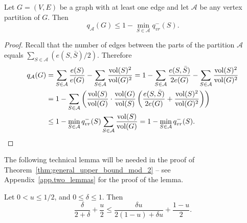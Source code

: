 \documentclass[runningheads, envcountsame, smallextended]{llncs}
\newcommand{\vol}{{\rm vol}}
\numberwithin{theorem}{section}
\numberwithin{definition}{section}
\numberwithin{lemma}{section}
\numberwithin{corollary}{section}
\numberwithin{proposition}{section}
\numberwithin{conjecture}{section}
\numberwithin{remark}{section}
\numberwithin{equation}{section}
\begin{document}
\begin{proposition} \label{prop.bound_by_worst_set_vertex}
	Let $G=(V,E)$ be a graph with at least one edge and let $\mathcal{A}$ be any vertex partition of $G$. Then
    \[
		q_{\mathcal{A}}(G) \leq 1 - \min_{S \in \mathcal{A}} q_{vr}^{-}(S).
	\]
\end{proposition}
\begin{proof}
	Recall that the number of edges between the parts of the partition $\mathcal{A}$ equals $\sum_{S \in \mathcal{A}} (e(S,\bar{S})/2)$. Therefore
	\[
	\begin{split}
		q_{\mathcal{A}}(G) & = \sum_{S \in \mathcal{A}}\frac{e(S)}{e(G)} - \sum_{S \in \mathcal{A}}\frac{\vol(S)^2}{\vol(G)^2} = 1 - \sum_{S \in \mathcal{A}}\frac{e(S,\bar{S})}{2 e(G)} - \sum_{S \in \mathcal{A}}\frac{\vol(S)^2}{\vol(G)^2} \\
		& = 1- \sum_{S \in \mathcal{A}} \left( \frac{\vol(S)}{\vol(G)} \cdot \frac{\vol(G)}{\vol(S)}\left(\frac{ e(S,\bar{S})}{2e(G)}+\frac{\vol(S)^2}{\vol(G)^2}\right) \right) \\
		& \leq 1 - \min_{S \in \mathcal{A}} q_{vr}^{-}(S) \sum_{S \in \mathcal{A}} \frac{\vol(S)}{\vol(G)} = 1 - \min_{S \in \mathcal{A}} q_{vr}^{-}(S).
	\end{split}
	\]
\end{proof}
%
%
%
%
The following technical lemma will be needed in the proof of Theorem~\ref{thm:general_upper_bound_mod_2} -- see Appendix~\ref{app.two_lemmas} for the proof of the lemma.

\begin{lemma}\label{lem:dull}
	Let $0 <  u \leq 1/2$, and $0 \leq \delta \leq 1$. Then
	\[ \frac{\delta}{2+\delta} + \frac{u}{2} \leq \frac{\delta u}{2(1-u) +\delta u} + \frac{1-u}{2}.\]
\end{lemma}
\end{document}
